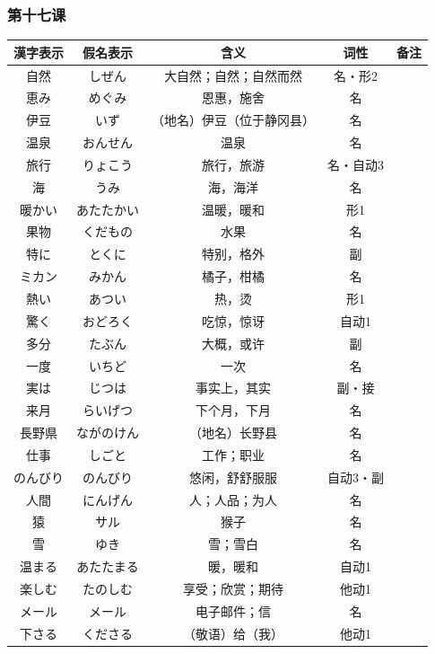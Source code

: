 \subsubsection{第十七课}
\begin{longtable}{|c|c|c|c|c|}
    \hline
漢字表示 & 假名表示  & 含义 & 词性 & 备注 \\ \hline\hline
自然 & しぜん & 大自然；自然；自然而然 & 名・形2 & \\ \hline
恵み & めぐみ & 恩惠，施舍 & 名 & \\ \hline
伊豆 & いず & （地名）伊豆（位于静冈县） & 名 & \\ \hline
温泉 & おんせん & 温泉 & 名 & \\ \hline
旅行 & りょこう & 旅行，旅游 & 名・自动3 & \\ \hline
海 & うみ & 海，海洋 & 名 & \\ \hline
暖かい & あたたかい & 温暖，暖和 & 形1 & \\ \hline
果物 & くだもの & 水果 & 名 & \\ \hline
特に & とくに & 特别，格外 & 副 & \\ \hline
ミカン & みかん & 橘子，柑橘 & 名 & \\ \hline
熱い & あつい & 热，烫 & 形1 & \\ \hline
驚く & おどろく & 吃惊，惊讶 & 自动1 & \\ \hline
多分 & たぶん & 大概，或许 & 副 & \\ \hline
一度 & いちど & 一次 & 名 & \\ \hline
実は & じつは & 事实上，其实 & 副・接 & \\ \hline
来月 & らいげつ & 下个月，下月 & 名 & \\ \hline
長野県 & ながのけん & （地名）长野县 & 名 & \\ \hline
仕事 & しごと & 工作；职业 & 名 & \\ \hline
のんびり & のんびり & 悠闲，舒舒服服 & 自动3・副 & \\ \hline
人間 & にんげん & 人；人品；为人 & 名 & \\ \hline
猿 & サル & 猴子 & 名 & \\ \hline
雪 & ゆき & 雪；雪白 & 名 & \\ \hline
温まる & あたたまる & 暖，暖和 & 自动1 & \\ \hline
楽しむ & たのしむ & 享受；欣赏；期待 & 他动1 & \\ \hline
メール & メール & 电子邮件；信 & 名 & \\ \hline
下さる & くださる & （敬语）给（我） & 他动1 & \\ \hline

\end{longtable}
